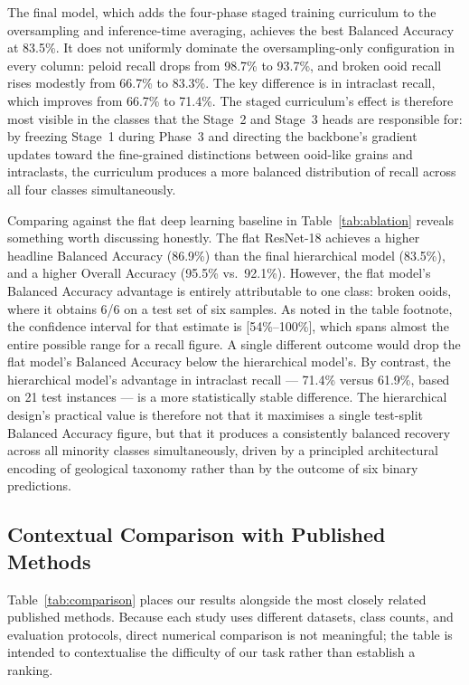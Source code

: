 \documentclass[a4paper,fleqn]{cas-dc}
\begin{document}
The final model, which adds the four-phase staged training curriculum to the oversampling and inference-time averaging, achieves the best Balanced Accuracy at 83.5\%. It does not uniformly dominate the oversampling-only configuration in every column: peloid recall drops from 98.7\% to 93.7\%, and broken ooid recall rises modestly from 66.7\% to 83.3\%. The key difference is in intraclast recall, which improves from 66.7\% to 71.4\%. The staged curriculum's effect is therefore most visible in the classes that the Stage~2 and Stage~3 heads are responsible for: by freezing Stage~1 during Phase~3 and directing the backbone's gradient updates toward the fine-grained distinctions between ooid-like grains and intraclasts, the curriculum produces a more balanced distribution of recall across all four classes simultaneously.

Comparing against the flat deep learning baseline in Table~\ref{tab:ablation} reveals something worth discussing honestly. The flat ResNet-18 achieves a higher headline Balanced Accuracy (86.9\%) than the final hierarchical model (83.5\%), and a higher Overall Accuracy (95.5\% vs.\ 92.1\%). However, the flat model's Balanced Accuracy advantage is entirely attributable to one class: broken ooids, where it obtains 6/6 on a test set of six samples. As noted in the table footnote, the confidence interval for that estimate is [54\%--100\%], which spans almost the entire possible range for a recall figure. A single different outcome would drop the flat model's Balanced Accuracy below the hierarchical model's. By contrast, the hierarchical model's advantage in intraclast recall --- 71.4\% versus 61.9\%, based on 21 test instances --- is a more statistically stable difference. The hierarchical design's practical value is therefore not that it maximises a single test-split Balanced Accuracy figure, but that it produces a consistently balanced recovery across all minority classes simultaneously, driven by a principled architectural encoding of geological taxonomy rather than by the outcome of six binary predictions.

\subsection{Contextual Comparison with Published Methods}
Table~\ref{tab:comparison} places our results alongside the most closely related published methods. Because each study uses different datasets, class counts, and evaluation protocols, direct numerical comparison is not meaningful; the table is intended to contextualise the difficulty of our task rather than establish a ranking.
\end{document}
